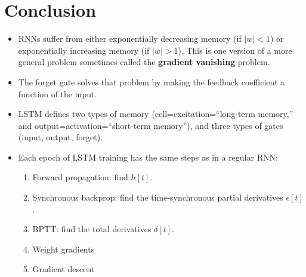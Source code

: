 \documentclass{beamer}
\begin{document}
\section{Conclusion}
\setcounter{subsection}{1}

\begin{frame}
  \begin{itemize}
  \item RNNs suffer from either exponentially decreasing memory (if
    $|w|<1$) or exponentially increasing memory (if $|w|>1$).  This is
    one version of a more general problem sometimes called the {\bf
      gradient vanishing} problem.
  \item The forget gate solves that problem by making the feedback
    coefficient a function of the input.
  \item LSTM defines two types of memory (cell=excitation=``long-term
    memory,'' and output=activation=``short-term memory''), and three
    types of gates (input, output, forget).
  \item Each epoch of LSTM training has the same steps as in a regular
    RNN:
    \begin{enumerate}
    \item Forward propagation: find $h[t]$.
    \item Synchronous backprop: find the time-synchronous partial
      derivatives $\epsilon[t]$.
    \item BPTT: find the total derivatives $\delta[t]$.
    \item Weight gradients
    \item Gradient descent
    \end{enumerate}
  \end{itemize}
\end{frame}
\end{document}
